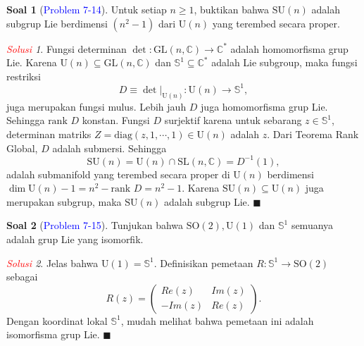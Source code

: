 \documentclass[11pt]{article}
\theoremstyle{definition}
\newtheorem*{problem}{Soal}
\theoremstyle{remark}
\newtheorem*{solution}{\textcolor{red}{Solusi}}
\newcommand{\C}{\mathbb{C}}             %
\newcommand{\Ssatu}{\mathbb{S}^1}       %
\newcommand{\GLnc}{\text{GL}(n,\mathbb{C})} %
\newcommand{\SLnc}{\text{SL}(n,\mathbb{C})} %
\newcommand{\Un}{\text{U}(n)}               %
\newcommand{\SUn}{\text{SU}(n)}             %
\newcommand{\rank}{\text{rank }}            %
\begin{document}
\begin{problem}[\textcolor{blue}{Problem 7-14}] 
Untuk setiap $n\geq 1$, buktikan bahwa $\text{SU}(n)$ adalah subgrup Lie berdimensi $(n^2-1)$ dari $\Un$ yang terembed secara proper.
\end{problem}
\begin{solution}
Fungsi determinan $\det : \GLnc \to \C^*$ adalah homomorfisma grup Lie. Karena $\Un \subseteq \GLnc$ dan $\Ssatu \subseteq \C^*$ adalah Lie subgroup, maka fungsi restriksi
$$
D\equiv \det|_{\Un} : \Un \to \Ssatu,
$$
juga merupakan fungsi mulus. Lebih jauh $D$ juga homomorfisma grup Lie. Sehingga $\rank D$ konstan. Fungsi $D$ surjektif karena untuk sebarang $z\in \Ssatu$, determinan matriks $Z=\text{diag}(z,1,\cdots,1) \in \Un$ adalah $z$. Dari Teorema Rank Global, $D$ adalah submersi. Sehingga 
$$
\SUn = \Un \cap \SLnc = D^{-1}(1),
$$
adalah submanifold yang terembed secara proper di $\Un$ berdimensi $\dim \Un - 1 =n^2 - \rank D = n^2-1$. Karena $\SUn \subseteq \Un$ juga merupakan subgrup, maka $\SUn$ adalah subgrup Lie. $\blacksquare$
\end{solution}


\begin{problem}[\textcolor{blue}{Problem 7-15}] 
Tunjukan bahwa $\text{SO}(2), \text{U}(1)$ dan $\mathbb{S}^1$ semuanya adalah grup Lie yang isomorfik.
\end{problem}
\begin{solution}
Jelas bahwa $\text{U}(1) = \Ssatu$. Definisikan pemetaan $R : \Ssatu \to \text{SO}(2)$ sebagai
$$
R(z) = \begin{pmatrix}
Re(z) & Im(z) \\
-Im(z) & Re(z)
\end{pmatrix}.
$$
Dengan koordinat lokal $\Ssatu$, mudah melihat bahwa pemetaan ini adalah isomorfisma grup Lie. $\blacksquare$
\end{solution}
\end{document}
